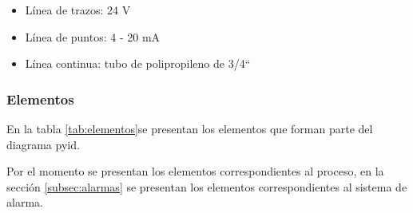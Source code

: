 \begin{itemize}
 \item Línea de trazos: 24 V
 \item Línea de puntos: 4 - 20 mA
 \item Línea continua: tubo de polipropileno de 3/4``
\end{itemize}

\subsubsection{Elementos}

En la tabla \ref{tab:elementos}se presentan los elementos
que forman parte del diagrama \gls{pyid}.

Por el momento se presentan los elementos correspondientes al 
proceso, en la sección \ref{subsec:alarmas} se presentan los
elementos correspondientes al sistema de alarma.


